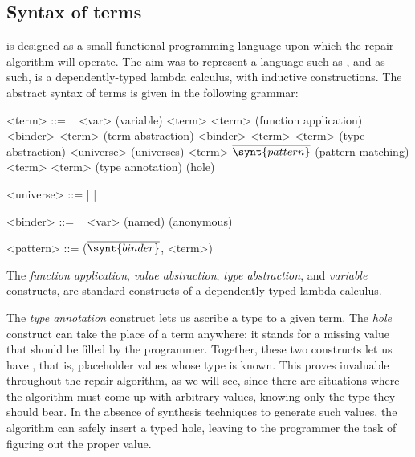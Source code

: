 \subsection{Syntax of \Chick{} terms}\label{chick-syntax-terms}

\Chick{} is designed as a small functional programming language upon which the
repair algorithm will operate.  The aim was to represent a language such as
\Gallina{}, and as such, \Chick{} is a dependently-typed lambda calculus, with
inductive constructions.  The abstract syntax of \Chick{} terms is given in the
following grammar:

\begin{grammar}%
<term> ::= \ %
\alt <var>                                               \hfill (variable)
\alt <term> <term>                                       \hfill (function application)
\alt {} <binder> \coqinline{,} <term>         \hfill (term abstraction)
\alt {} <binder> \coqinline{:} <term>
 <term>                                   \hfill (type abstraction)
\alt <universe>                                          \hfill (universes)
\alt {} <term> 
$\overline{ \synt{pattern} }$             \hfill (pattern matching)
\alt <term> \coqinline{:} <term>                         \hfill (type annotation)
\alt \coqinline{_}                                       \hfill (hole)

<universe> ::=  |  | 

<binder> ::= \ %
\alt <var>         \hfill (named)
\alt \coqinline{_} \hfill (anonymous)

<pattern> ::= ($\overline{ \synt{binder} }$, <term>)
\end{grammar}

The \emph{function application}, \emph{value abstraction}, \emph{type
abstraction}, and \emph{variable} constructs, are standard constructs of a
dependently-typed lambda calculus.

The \emph{type annotation} construct lets us ascribe a type to a given term.
The \emph{hole} construct can take the place of a term anywhere: it stands for a
missing value that should be filled by the programmer.  Together, these two
constructs let us have , that is, placeholder values whose
type is known.  This proves invaluable throughout the repair algorithm, as we
will see, since there are situations where the algorithm must come up with
arbitrary values, knowing only the type they should bear.  In the absence of
synthesis techniques to generate such values, the algorithm can safely insert a
typed hole, leaving to the programmer the task of figuring out the proper value.

